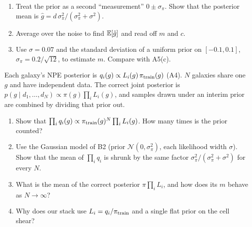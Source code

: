 
\begin{enumerate}
  \item Treat the prior as a second ``measurement'' $0 \pm \sigma_\pi$. Show that the posterior mean is
    $\hat g = d\,\sigma_\pi^2/(\sigma_\pi^2 + \sigma^2)$.
  \item Average over the noise to find $\mathbb{E}[\hat g]$ and read off $m$ and $c$.
  \item Use $\sigma = 0.07$ and the standard deviation of a uniform prior on $[-0.1, 0.1]$,
    $\sigma_\pi = 0.2/\sqrt{12}$, to estimate $m$. Compare with A5(c).
\end{enumerate}



\begin{given}
Each galaxy's NPE posterior is $q_i(g) \propto L_i(g)\,\pi_{\rm train}(g)$ (A4). $N$ galaxies share one $g$ and have
independent data. The correct joint posterior is $p(g\mid d_1,\dots,d_N) \propto \pi(g)\prod_i L_i(g)$, and samples
drawn under an interim prior are combined by dividing that prior out.
\end{given}


\begin{enumerate}
  \item Show that $\prod_i q_i(g) \propto \pi_{\rm train}(g)^N\prod_i L_i(g)$. How many times is the prior counted?
  \item Use the Gaussian model of B2 (prior $\mathcal N(0,\sigma_\pi^2)$, each likelihood width $\sigma$). Show that the
    mean of $\prod_i q_i$ is shrunk by the same factor $\sigma_\pi^2/(\sigma_\pi^2+\sigma^2)$ for every $N$.
  \item What is the mean of the correct posterior $\pi\prod_i L_i$, and how does its $m$ behave as $N \to \infty$?
  \item Why does our stack use $L_i = q_i/\pi_{\rm train}$ and a single flat prior on the cell shear?
\end{enumerate}

